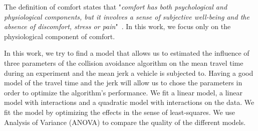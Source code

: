 
The definition of comfort states that "\textit{comfort has both psychological and physiological components, but it involves a sense of subjective well-being and the absence of discomfort, stress or pain}"~\cite{richards_psychology_1980}. In this work, we focus only on the physiological component of comfort. 

In this work, we try to find a model that allows us to estimated the influence of three parameters of the collision avoidance algorithm on the mean travel time during an experiment and the mean jerk a vehicle is subjected to. Having a good model of the travel time and the jerk will allow us to chose the parameters in order to optimize the algorithm's performance. We fit a linear model, a linear model with interactions and a quadratic model with interactions on the data. We fit the model by optimizing the effects in the sense of least-squares.
We use Analysis of Variance (ANOVA) to compare the quality of the different models.

